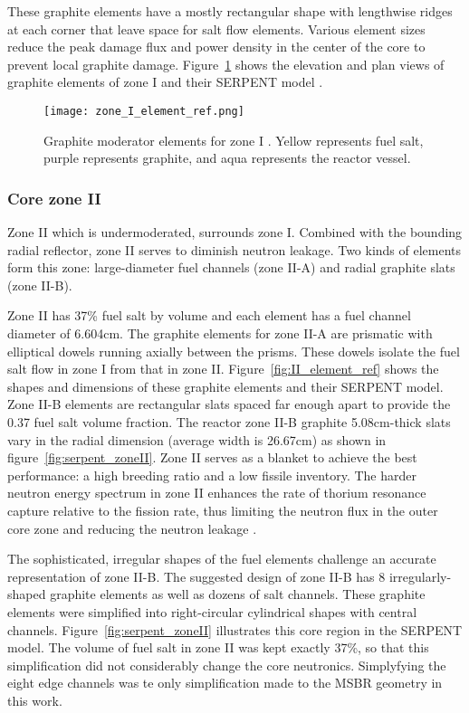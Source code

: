 These graphite elements have a mostly rectangular shape with lengthwise ridges 
at each corner that leave space for salt flow elements. Various element sizes 
reduce the peak damage flux and power density in the center of the core to 
prevent local graphite damage.  Figure~\ref{fig:I_element_ref} shows the 
elevation and plan views of graphite elements of zone I 
\cite{robertson_conceptual_1971} and their SERPENT model 
\cite{rykhlevskii_full-core_2017}.

\begin{figure}[ht!] %
  \texttt{[image: zone\_I\_element\_ref.png]}
  \caption{Graphite moderator elements for zone I 
  \cite{robertson_conceptual_1971,rykhlevskii_full-core_2017}.  Yellow 
  represents fuel salt, purple represents graphite, and aqua represents the 
  reactor vessel.}
  \label{fig:I_element_ref}
\end{figure}

\subsubsection{Core zone II}
Zone II which is undermoderated, surrounds zone I. Combined with the bounding 
radial reflector, zone II serves to diminish neutron leakage. Two kinds of 
elements form this zone: large-diameter fuel channels (zone II-A) and 
radial graphite slats (zone II-B). 

Zone II has 37\% fuel salt by volume and each element has a fuel channel 
diameter of 6.604cm. The graphite elements for zone II-A are prismatic with
elliptical dowels running axially between the prisms. These dowels
isolate the fuel salt flow in zone I from that in zone II. 
Figure~\ref{fig:II_element_ref} shows the shapes and dimensions of these graphite 
elements and their SERPENT model. Zone II-B elements are rectangular slats 
spaced far enough apart to provide the 0.37 fuel salt volume fraction. The 
reactor zone II-B graphite 5.08cm-thick slats vary in the radial dimension 
(average width is 26.67cm) as shown in figure~\ref{fig:serpent_zoneII}. Zone II 
serves as a blanket to achieve the best performance: a high breeding ratio and 
a low fissile inventory. The harder neutron energy spectrum in zone II 
enhances the rate of thorium resonance capture relative to the fission rate, 
thus limiting the neutron flux in the outer core zone and reducing the neutron 
leakage \cite{robertson_conceptual_1971}. 

The sophisticated, irregular shapes of the fuel elements challenge an accurate 
representation of zone II-B.  
The suggested design \cite{robertson_conceptual_1971} of zone II-B has 8 
irregularly-shaped graphite elements as well as dozens of salt channels. 
These graphite elements were simplified into right-circular cylindrical shapes  
with central channels. Figure~\ref{fig:serpent_zoneII} illustrates this core 
region in the SERPENT model. The volume of fuel salt in zone II was kept 
exactly 37\%, so that this simplification did not considerably change the core 
neutronics. Simplyfying the eight edge channels was te only simplification made 
to the \gls{MSBR} geometry in this work. 

